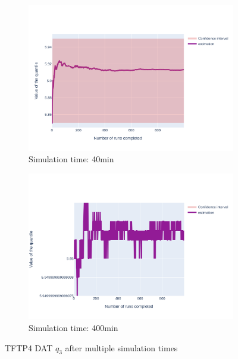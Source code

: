 \documentclass{article}
\begin{document}
\begin{figure}[H]
\begin{subfigure}{.495\textwidth}
    \end{subfigure}
    \begin{subfigure}{.495\textwidth}
        \centering
        \includegraphics[width=\textwidth]{../fig/quantile3/TFTP4 DAT_40mn.png}
        \caption{Simulation time: 40min}
    \end{subfigure}
    \begin{subfigure}{.495\textwidth}
        \centering
        \includegraphics[width=\textwidth]{../fig/quantile3/TFTP4 DAT_400mn.png}
        \caption{Simulation time: 400min}
    \end{subfigure}
    \caption{TFTP4 DAT $q_3$ after multiple simulation times}
\end{figure}
\end{document}

